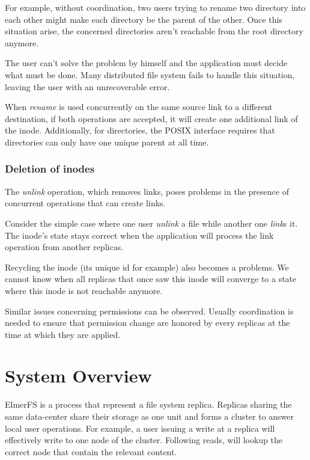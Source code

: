 \documentclass[sigplan, 10pt]{acmart}
\begin{document}
For example, without coordination, two users trying to rename
two directory into each other might make each directory be the parent of the other.
Once this situation arise, the concerned directories aren't reachable
from the root directory anymore.

The user can't solve the problem by himself and the application must
decide what must be done. Many distributed file system fails
to handle this situation, leaving the user with an unrecoverable error.

When \textit{rename} is used concurrently on the same source link to a different
destination, if both operations are accepted, it will create one additional
link of the inode. Additionally, for directories, the POSIX interface requires
that directories can only have one unique parent at all time.

\subsubsection{Deletion of inodes}

The \textit{unlink} operation, which removes links, poses problems
in the presence of concurrent operations that can create links.

Consider the simple case where one user \textit{unlink} a file while another
one \textit{link}s it. The inode's state stays correct when the
application will process the link operation from another replicas.

Recycling the inode (its unique id for example) also becomes a problems.
We cannot know when all replicas that once saw this inode
will converge to a state where this inode is not reachable anymore.

Similar issues concerning permissions can be observed. Usually coordination is
needed to ensure that permission change are honored by every replicas at
the time at which they are applied.

\section{System Overview}

ElmerFS is a process that represent a file system replica. Replicas
sharing the same data-center share their storage as one unit and forms
a cluster to answer local user operations. For example, a user issuing a write
at a replica will effectively write to one node of the cluster. Following reads,
will lookup the correct node that contain the relevant content.
\end{document}
